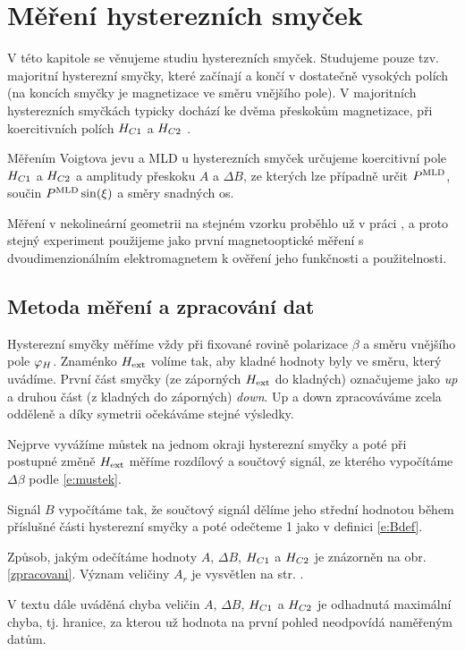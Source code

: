 \chapter{Měření hysterezních smyček}
V této kapitole se věnujeme studiu hysterezních smyček. 
Studujeme pouze tzv. majoritní hysterezní smyčky, které začínají a končí v dostatečně vysokých polích (na koncích smyčky je magnetizace ve směru vnějšího pole).
V majoritních hysterezních smyčkách typicky dochází ke dvěma přeskokům magnetizace, při koercitivních polích $H_{C1}$ a $H_{C2}$ \cite{Reichlova}.

Měřením Voigtova jevu a MLD u hysterezních smyček určujeme koercitivní pole $H_{C1}$ a $H_{C2}$ a amplitudy přeskoku $A$ a $\Delta B$, ze kterých lze případně určit $P^{\text{MLD}}$, součin $P^{\text{MLD}} \sin(\xi)$ a směry snadných os.


Měření v nekolineární geometrii na stejném vzorku proběhlo už v práci \cite{Reichlova}, a proto stejný experiment použijeme jako první magnetooptické měření s dvoudimenzionálním elektromagnetem k ověření jeho funkčnosti a použitelnosti.

\section{Metoda měření a zpracování dat} \label{zpracovani_smycek}
Hysterezní smyčky měříme vždy při fixované rovině polarizace $\beta$ a směru vnějšího pole $\varphi_H$.
Znaménko $H_\text{ext}$ volíme tak, aby kladné hodnoty byly ve směru, který uvádíme. První část smyčky (ze záporných $H_\text{ext}$ do kladných) označujeme jako \emph{up} a druhou část (z kladných do záporných) \emph{down}.
Up a down zpracováváme zcela odděleně a díky symetrii očekáváme stejné výsledky.

Nejprve vyvážíme můstek na jednom okraji hysterezní smyčky a poté při postupné změně $H_\text{ext}$ měříme rozdílový a součtový signál, ze kterého vypočítáme $\Delta\beta$ podle \eqref{e:mustek}.


Signál $B$ vypočítáme tak, že součtový signál dělíme jeho střední hodnotou během příslušné části hysterezní smyčky a poté odečteme 1 jako v definici \eqref{e:Bdef}.

Způsob, jakým odečítáme hodnoty $A$, $\Delta B$, $H_{C1}$ a $H_{C2}$ je znázorněn na obr. \ref{zpracovani}. Význam veličiny $A_r$ je vysvětlen na str. \pageref{e:Ar}.


V textu dále uváděná chyba veličin $A$, $\Delta B$, $H_{C1}$ a $H_{C2}$ je odhadnutá maximální chyba, tj. hranice, za kterou už hodnota na první pohled neodpovídá naměřeným datům.

